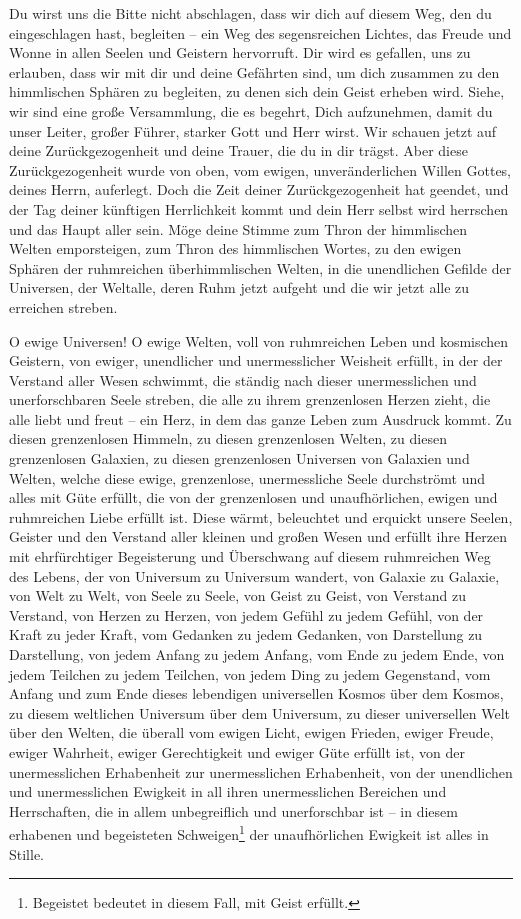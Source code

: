 Du wirst uns die Bitte nicht abschlagen, dass wir dich auf diesem Weg, den du eingeschlagen hast, begleiten -- ein Weg des segensreichen Lichtes, das Freude und Wonne in allen Seelen und Geistern hervorruft. Dir wird es gefallen, uns zu erlauben, dass wir mit dir und deine Gefährten sind, um dich zusammen zu den himmlischen Sphären zu begleiten, zu denen sich dein Geist erheben wird. Siehe, wir sind eine große Versammlung, die es begehrt, Dich aufzunehmen, damit du unser Leiter, großer Führer, starker Gott und Herr wirst. Wir schauen jetzt auf deine Zurückgezogenheit und deine Trauer, die du in dir trägst. Aber diese Zurückgezogenheit wurde von oben, vom ewigen, unveränderlichen Willen Gottes, deines Herrn, auferlegt. Doch die Zeit deiner Zurückgezogenheit hat geendet, und der Tag deiner künftigen Herrlichkeit kommt und dein Herr selbst wird herrschen und das Haupt aller sein. Möge deine Stimme zum Thron der himmlischen Welten emporsteigen, zum Thron des himmlischen Wortes, zu den ewigen Sphären der ruhmreichen überhimmlischen Welten, in die unendlichen Gefilde der Universen, der Weltalle, deren Ruhm jetzt aufgeht und die wir jetzt alle zu erreichen streben.

O ewige Universen! O ewige Welten, voll von ruhmreichen Leben und kosmischen Geistern, von ewiger, unendlicher und unermesslicher Weisheit erfüllt, in der der Verstand aller Wesen schwimmt, die ständig nach dieser unermesslichen und unerforschbaren Seele streben, die alle zu ihrem grenzenlosen Herzen zieht, die alle liebt und freut -- ein Herz, in dem das ganze Leben zum Ausdruck kommt. Zu diesen grenzenlosen Himmeln, zu diesen grenzenlosen Welten, zu diesen grenzenlosen Galaxien, zu diesen grenzenlosen Universen von Galaxien und Welten, welche diese ewige, grenzenlose, unermessliche Seele durchströmt und alles mit Güte erfüllt, die von der grenzenlosen und unaufhörlichen, ewigen und ruhmreichen Liebe erfüllt ist. Diese wärmt, beleuchtet und erquickt unsere Seelen, Geister und den Verstand aller kleinen und großen Wesen und erfüllt ihre Herzen mit ehrfürchtiger Begeisterung und Überschwang auf diesem ruhmreichen Weg des Lebens, der von Universum zu Universum wandert, von Galaxie zu Galaxie, von Welt zu Welt, von Seele zu Seele, von Geist zu Geist, von Verstand zu Verstand, von Herzen zu Herzen, von jedem Gefühl zu jedem Gefühl, von der Kraft zu jeder Kraft, vom Gedanken zu jedem Gedanken, von Darstellung zu Darstellung, von jedem Anfang zu jedem Anfang, vom Ende zu jedem Ende, von jedem Teilchen zu jedem Teilchen, von jedem Ding zu jedem Gegenstand, vom Anfang und zum Ende dieses lebendigen universellen Kosmos über dem Kosmos, zu diesem weltlichen Universum über dem Universum, zu dieser universellen Welt über den Welten, die überall vom ewigen Licht, ewigen Frieden, ewiger Freude, ewiger Wahrheit, ewiger Gerechtigkeit und ewiger Güte erfüllt ist, von der unermesslichen Erhabenheit zur unermesslichen Erhabenheit, von der unendlichen und unermesslichen Ewigkeit in all ihren unermesslichen Bereichen und Herrschaften, die in allem unbegreiflich und unerforschbar ist -- in diesem erhabenen und begeisteten Schweigen\footnote{Begeistet bedeutet in diesem Fall, mit Geist erfüllt.} der unaufhörlichen Ewigkeit ist alles in Stille. 


